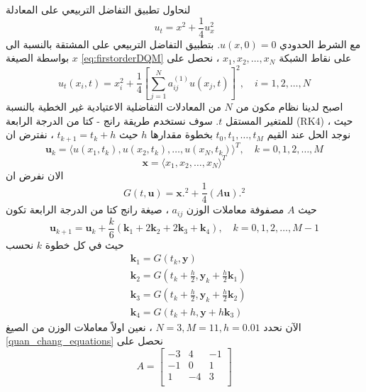 \begin{example}
	لنحاول تطبيق التفاضل التربيعي على المعادلة 
	\begin{equation}
		\label{eq:firstex}
		u_t = x^2 + \frac{1}{4} u_x^2
	\end{equation}
	مع الشرط الحدودي $u(x,0) = 0$. بتطبيق التفاضل التربيعي على المشتقة بالنسبة الى $x$ بواسطة الصيغة \eqref{eq:firstorderDQM} على نقاط الشبكة $x_1, x_2, \dots, x_N$ ، نحصل على
	\begin{equation}
		\label{eq:firstexapplied}
		u_t (x_i, t) = x_i^2 + \frac{1}{4} \left[\sum_{j=1}^{N} a_{ij}^{(1)} u(x_j, t)\right]^2 , \quad i=1,2,\dots,N
 	\end{equation}
 	اصبح لدينا نظام مكون من $N$ من المعادلات التفاضلية الاعتيادية غير الخطية بالنسبة للمتغير المستقل $t$. سوف نستخدم طريقة رانج - كتا من الدرجة الرابعة (RK4) ، حيث نوجد الحل عند القيم $t_0, t_1, \dots, t_M$ بخطوة مقدارها $h$ حيث $t_{k+1} = t_k + h$ ، نفترض ان 
 	\[
 	\mathbf{u}_k = \langle u(x_1, t_k) , u(x_2,t_k), \dots, u(x_N, t_k)\rangle^T, \quad k=0,1,2,\dots,M
 	\]
 	\[
 	\mathbf{x} = \langle x_1, x_2, \dots, x_N\rangle^T
 	\]
 	الان نفرض ان
 	\[
 	G(t, \mathbf{u}) = \mathbf{x}.^2 + \frac{1}{4} (A \mathbf{u}).^2
 	\]
 	حيث $A$ مصفوفة معاملات الوزن $a_{ij}$ ، صيغة رانج كتا من الدرجة الرابعة تكون
 	\begin{equation}
 		\label{eq:firstexRK4}
 		\mathbf{u}_{k+1} = \mathbf{u}_k + \frac{k}{6} (\mathbf{k}_1+2\mathbf{k}_2+2\mathbf{k}_3+\mathbf{k}_4), \quad k=0,1,2,\dots,M-1
 	\end{equation}
 	حيث في كل خطوة $k$ نحسب
\begin{equation}
	 	\label{eq:RK4coeffs}
 	\begin{aligned}
 		&\mathbf{k}_1 = G(t_k, \mathbf{y})\\
 		&\mathbf{k}_2 = G\left(t_k + \frac{h}{2}, \mathbf{y}_k + \frac{h}{2}\mathbf{k}_1  \right)\\
 		&\mathbf{k}_3 = G\left(t_k + \frac{h}{2}, \mathbf{y}_k + \frac{h}{2}\mathbf{k}_2  \right)\\
 		&\mathbf{k}_4 = G(t_k + h, \mathbf{y} + h\mathbf{k}_3)
 	\end{aligned}
\end{equation}
 	الآن نحدد $N=3, M=11, h=0.01 $ ، نعين اولاً معاملات الوزن من الصيغ \eqref{quan_chang_equations} نحصل على 
 	\[
 	A = 
\begin{bmatrix}
	-3 & 4 & -1 \\
	-1 & 0 & 1 \\
	1 & -4 & 3 \\
\end{bmatrix}
\]
\end{example}
